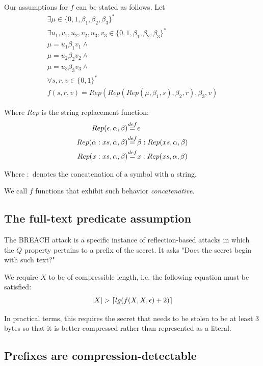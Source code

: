 \documentclass[conference, letterpaper, 10pt]{IEEEtran}
\DeclarePairedDelimiter{\ceil}{\lceil}{\rceil}
\newcommand\defeq{\stackrel{\mathclap{\normalfont\mbox{def}}}{=}}
\begin{document}
Our assumptions for $f$ can be stated as follows. Let
\begin{equation*}
\begin{split}
\exists \mu \in \{0, 1, \beta_1, \beta_2, \beta_3\}^*\\
\exists u_1, v_1, u_2, v_2, u_3, v_3 \in \{0, 1, \beta_1, \beta_2, \beta_3\}^*\\
\mu = u_1 \beta_1 v_1 \land\\
\mu = u_2 \beta_2 v_2 \land\\
\mu = u_3 \beta_3 v_3 \land\\
\forall s, r, v \in \{0, 1\}^*\\
f(s, r, v) = Rep(Rep(Rep(\mu, \beta_1, s), \beta_2, r), \beta_3, v)
\end{split}
\end{equation*}

Where $Rep$ is the string replacement function:
\begin{align*}
Rep(\epsilon, \alpha, \beta) &\defeq \epsilon\\
Rep(\alpha:xs, \alpha, \beta) &\defeq \beta:Rep(xs, \alpha, \beta)\\
Rep(x:xs, \alpha, \beta) &\defeq x:Rep(xs, \alpha, \beta)
\end{align*}

Where $:$ denotes the concatenation of a symbol with a string.

We call $f$ functions that exhibit such behavior \textit{concatenative}.

\subsection{The full-text predicate assumption}\label{subsec:fulltextassumption}

The BREACH attack is a specific instance of reflection-based attacks in which
the $Q$ property pertains to a prefix of the secret. It asks "Does the secret
begin with such text?"

We require $X$ to be of compressible length,
i.e. the following equation must be satisfied:
\begin{equation*}
    |X| > \ceil{lg(f(X, X, \epsilon) + 2)}
\end{equation*}

In practical terms, this requires the secret that needs to be stolen to be at
least 3 bytes so that it is better compressed rather than represented as a
literal.

\subsection{Prefixes are
compression-detectable}\label{subsec:breachprefix}
\end{document}
